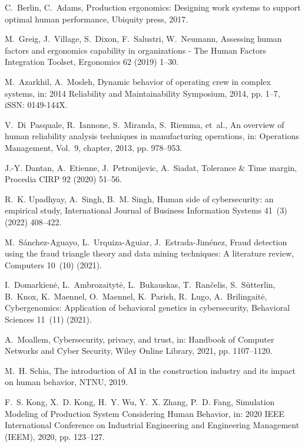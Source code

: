 \documentclass[review,12pt, 3p, times]{elsarticle}
\begin{document}
\begin{thebibliography}{00}
C.~Berlin, C.~Adams, Production ergonomics: Designing work systems to support
  optimal human performance, Ubiquity press, 2017.

M.~Greig, J.~Village, S.~Dixon, F.~Salustri, W.~Neumann, Assessing human
  factors and ergonomics capability in organizations - {The} {Human} {Factors}
  {Integration} {Toolset}, Ergonomics 62 (2019) 1--30.

M.~Azarkhil, A.~Mosleh, Dynamic behavior of operating crew in complex systems,
  in: 2014 {Reliability} and {Maintainability} {Symposium}, 2014, pp. 1--7,
  iSSN: 0149-144X.

V.~Di~Pasquale, R.~Iannone, S.~Miranda, S.~Riemma, et~al., An overview of human
  reliability analysis techniques in manufacturing operations, in: Operations
  Management, Vol.~9, chapter, 2013, pp. 978--953.

J.-Y. Dantan, A.~Etienne, J.~Petronijevic, A.~Siadat, Tolerance \& {Time}
  margin, Procedia CIRP 92 (2020) 51--56.

R.~K. Upadhyay, A.~Singh, B.~M. Singh, Human side of cybersecurity: an
  empirical study, International Journal of Business Information Systems 41~(3)
  (2022) 408--422.

M.~S{\'a}nchez-Aguayo, L.~Urquiza-Aguiar, J.~Estrada-Jim{\'e}nez, Fraud
  detection using the fraud triangle theory and data mining techniques: {A}
  literature review, Computers 10~(10) (2021).

I.~Domarkienė, L.~Ambrozaitytė, L.~Bukauskas, T.~Rančelis, S.~Sütterlin,
  B.~Knox, K.~Maennel, O.~Maennel, K.~Parish, R.~Lugo, A.~Brilingaitė,
  Cybergenomics: {Application} of behavioral genetics in cybersecurity,
  Behavioral Sciences 11~(11) (2021).

A.~Moallem, Cybersecurity, privacy, and trust, in: Handbook of Computer
  Networks and Cyber Security, Wiley Online Library, 2021, pp. 1107--1120.

M.~H. Schia, The introduction of AI in the construction industry and its impact
  on human behavior, NTNU, 2019.

F.~S. Kong, X.~D. Kong, H.~Y. Wu, Y.~X. Zhang, P.~D. Fang, Simulation
  {Modeling} of {Production} {System} {Considering} {Human} {Behavior}, in:
  2020 {IEEE} {International} {Conference} on {Industrial} {Engineering} and
  {Engineering} {Management} ({IEEM}), 2020, pp. 123--127.


\end{thebibliography}
\end{document}
